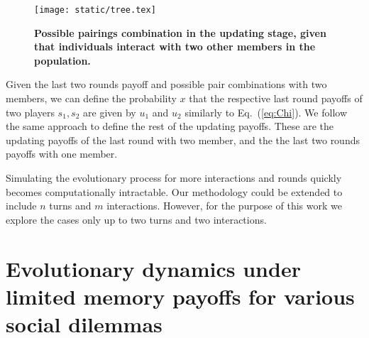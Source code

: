\documentclass[11pt]{article}
\theoremstyle{plainCl1}
\theoremstyle{plainCl2}
\begin{document}
\begin{figure}[!htbp]
  \centering
  \texttt{[image: static/tree.tex]}
  \caption{\textbf{Possible pairings combination in the updating stage, given
  that individuals interact with two other members in the population.}}
  \label{fig:pissible_two_pairs}
\end{figure}

Given the last two rounds payoff and possible pair combinations with two
members, we can define the probability \(x\) that the respective last round
payoffs of two players \(s_1, s_2\) are given by $u_1$ and $u_2$ similarly to
Eq.~(\ref{eq:Chi}). We follow the same approach to define the rest of the
updating payoffs. These are the updating payoffs of the last round with two
member, and the the last two rounds payoffs with one member.

Simulating the evolutionary process for more interactions and rounds quickly
becomes computationally intractable. Our methodology could be extended to
include \(n\) turns and \(m\) interactions. However, for the purpose of this
work we explore the cases only up to two turns and two interactions.


\section{Evolutionary dynamics under limited memory payoffs for various social
dilemmas}\label{appendix:further_simulation_results}
\end{document}
